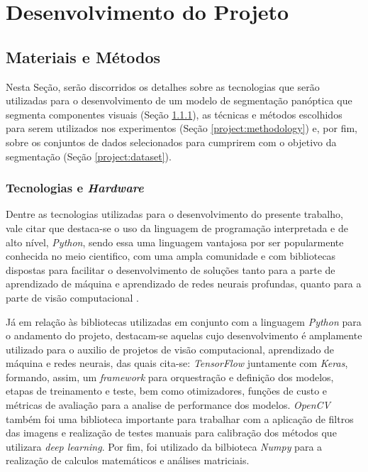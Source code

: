 \newpage
\clearpage

\section{Desenvolvimento do Projeto}
\label{project:project}

\subsection{Materiais e Métodos}
\label{project:matmet}
Nesta Seção, serão discorridos os detalhes sobre as tecnologias que serão utilizadas para o desenvolvimento de um modelo de segmentação panóptica que segmenta componentes visuais (Seção \ref{project:techard}), as técnicas e métodos escolhidos para serem utilizados nos experimentos (Seção \ref{project:methodology}) e, por fim, sobre os conjuntos de dados selecionados para cumprirem com o objetivo da segmentação (Seção \ref{project:dataset}).


\subsubsection{Tecnologias e \textit{Hardware}}
\label{project:techard}
Dentre as tecnologias utilizadas para o desenvolvimento do presente trabalho, vale citar que destaca-se o uso da linguagem de programação interpretada e de alto nível, \textit{Python}, sendo essa uma linguagem vantajosa por ser popularmente conhecida no meio cientifico, com uma ampla comunidade e com  bibliotecas dispostas para facilitar o desenvolvimento de soluções tanto para a parte de aprendizado de máquina e aprendizado de redes neurais profundas, quanto para a parte de visão computacional \citep{Millman2011PythonEngineers}.

Já em relação às bibliotecas utilizadas em conjunto com a linguagem \textit{Python} para o andamento do projeto, destacam-se aquelas cujo desenvolvimento é amplamente utilizado para o auxilio de projetos de visão computacional, aprendizado de máquina e redes neurais, das quais cita-se: \textit{TensorFlow} juntamente com \textit{Keras}, formando, assim, um \textit{framework} para orquestração e definição dos modelos, etapas de treinamento e teste, bem como otimizadores, funções de custo e métricas de avaliação para a analise de performance dos modelos. \textit{OpenCV} também foi uma biblioteca importante para trabalhar com a aplicação de filtros das imagens e realização de testes manuais para calibração dos métodos que utilizara \textit{deep learning}. Por fim, foi utilizado da bilbioteca \textit{Numpy} para a realização de calculos matemáticos e análises matriciais.

